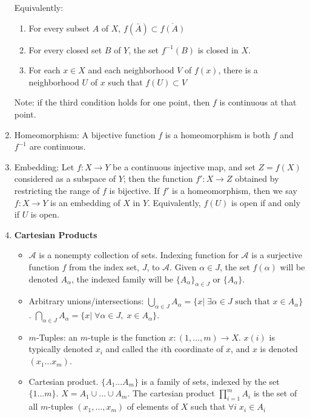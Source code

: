 \documentclass[12pt,letterpaper]{article}
\begin{document}
\begin{enumerate}
  Equivalently:
  \begin{enumerate} %
    \item \label{dfn:continuous2} For every subset $A$ of $X$, $f(\bar{A}) \subset \overline{f(A)}$
    \item \label{dfn:continuous3} For every closed set $B$ of $Y$, the set $f^{-1}(B)$ is closed in $X$.
    \item \label{dfn:continuous4} For each $x\in X$ and each neighborhood $V$ of $f(x)$, there is a neighborhood $U$ of $x$ such that $f(U) \subset V$
  \end{enumerate}
  Note: if the third condition holds for one point, then $f$ is continuous at that point.
  \item \label{dfn:homeomorphism} Homeomorphism: A bijective function $f$ is a homeomorphism is both $f$ and $f^{-1}$ are continuous.
  \item \label{dfn:embedding} Embedding: Let $f: X\rightarrow Y$ be a continuous injective map, and set $Z=f(X)$ considered as a subspace of $Y$; then the function $f': X\rightarrow Z$ obtained by restricting the range of $f$ is bijective. If $f'$ is a homeomorphism, then we say $f:X\rightarrow Y$ is an embedding of $X$ in $Y$.
  Equivalently, $f(U)$ is open if and only if $U$ is open.
  \item \label{dfn:cartesianProducts} \textbf{Cartesian Products}
  \begin{itemize}
    \item $\mathcal{A}$ is a nonempty collection of sets. Indexing function for $\mathcal{A}$ is a surjective function $f$ from the index set, $J$, to $\mathcal{A}$. Given $\alpha \in J$, the set $f(\alpha)$ will be denoted $A_\alpha$, the indexed family will be $\{A_\alpha\}_{\alpha\in J}$ or $\{A_\alpha\}$.
    \item Arbitrary unions/intersections: $\displaystyle\bigcup_{\alpha\in J} A_\alpha = \{x |\; \exists \alpha \in J \text{ such that } x\in A_\alpha \}$. $\displaystyle\bigcap_{\alpha\in J} A_\alpha = \{x |\; \forall \alpha \in J,\; x\in A_\alpha \}$.
    \item $m$-Tuples: an $m$-tuple is the function $x: (1,\dots,m)\rightarrow X$. $x(i)$ is typically denoted $x_i$ and called the $i$th coordinate of $x$, and $x$ is denoted $(x_1\dots x_m)$.
    \item Cartesian product. $\{A_1\dots A_m\}$ is a family of sets, indexed by the set $\{1\dots m\}$. $X = A_1 \cup\dots \cup A_m$. The cartesian product $\displaystyle\prod_{i=1}^{m}A_i$ is the set of all $m$-tuples $(x_1,\dots ,x_m)$ of elements of $X$ such that $\forall i\; x_i \in A_i$

\end{itemize}
\end{enumerate}
\end{document}
